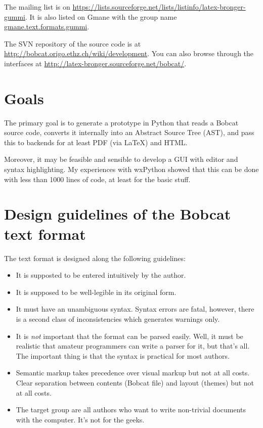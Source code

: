 \documentclass[12pt,openany]{book}
\begin{document}
The mailing list is on
\url{https://lists.sourceforge.net/lists/listinfo/latex-bronger-gummi}.  It is
also listed on Gmane with the group name \url{gmane.text.formats.gummi}.

The SVN repository of the source code is at
\url{http://bobcat.origo.ethz.ch/wiki/development}.  You can also browse through
the interfaces at \url{http://latex-bronger.sourceforge.net/bobcat/}.


\section{Goals}

The primary goal is to generate a prototype in Python that reads a Bobcat
source code, converts it internally into an Abstract Source Tree (AST), and
pass this to backends for at least PDF (via \LaTeX) and HTML\@.

Moreover, it may be feasible and sensible to develop a GUI with editor and
syntax highlighting.  My experiences with wxPython showed that this can be done
with less than 1000 lines of code, at least for the basic stuff.


\section{Design guidelines of the Bobcat text format}

The text format is designed along the following guidelines:

\begin{itemize}
\item It is supposted to be entered intuitively by the author.
\item It is supposed to be well-legible in its original form.
\item It must have an unambiguous syntax.  Syntax errors are fatal, however,
  there is a second class of inconsistencies which generates warnings only.
\item It is \emph{not} important that the format can be parsed easily.  Well,
  it must be realistic that amateur programmers can write a parser for it, but
  that's all.  The important thing is that the syntax is practical for most
  authors.
\item Semantic markup takes precedence over visual markup but not at all costs.
  Clear separation between contents (Bobcat file) and layout (themes) but not at
  all costs.
\item The target group are all authors who want to write non-trivial documents
  with the computer.  It's not for the geeks.
\end{itemize}
\end{document}
